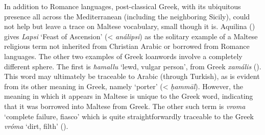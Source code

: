 \documentclass[output=paper]{langsci/langscibook}
\begin{document}
In addition to Romance languages, post-classical Greek, with its ubiquitous presence all across the Mediterranean (including the neighboring Sicily), could not help but leave a trace on Maltese vocabulary, small though it is. Aquilina (\citeyear[23]{aquilina1976}) gives \textit{Lapsi} `Feast of Ascension' (< \textit{análipsi}) as the solitary example of a Maltese religious term not inherited from Christian Arabic or borrowed from Romance languages. The other two examples of Greek loanwords involve a completely different sphere. The first is \textit{ħamallu} `lewd, vulgar person', from Greek \textit{xamális} (\citealt[7781]{megaleksikon1958}). This word may ultimately be traceable to Arabic (through Turkish), as is evident from its other meaning in Greek, namely `porter' (< \textit{ḥammāl}). However, the meaning in which it appears in Maltese is unique to the Greek word, indicating that it was borrowed into Maltese from Greek. The other such term is \textit{vroma} `complete failure, fiasco' which is quite straightforwardly traceable to the Greek \textit{vróma} `dirt, filth' (\citealt[1506, 1516]{megaleksikon1958}).
\end{document}
